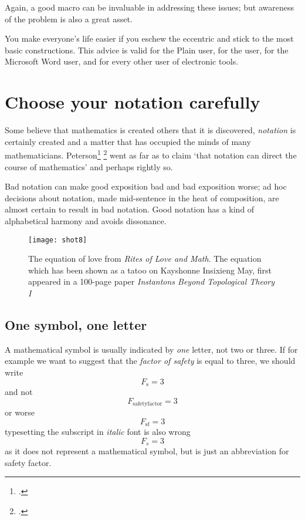 {Again, a good macro can be invaluable in addressing these issues; but
awareness of the problem is also a great asset.

\begin{latexquotation}
You make everyone's
life easier if you eschew the eccentric and stick to the most basic constructions. This advice is valid for the Plain \tex user, for the \latex
user, for the Microsoft Word user, and for every other user of electronic
tools.
\end{latexquotation}



\section{Choose your notation carefully}

Some believe that mathematics is created others that it is discovered, \emph{notation} is certainly created and
a matter that has occupied the minds of many mathematicians. Peterson\footcite{peterson2009} \footcite{peterson2009}  went as far as to claim  `that notation can direct the course of mathematics’ and perhaps rightly so.

Bad notation can make good exposition bad and bad exposition worse; ad hoc decisions about notation, made mid-sentence in the heat of composition, are almost certain to result in bad notation. Good notation has a kind of alphabetical harmony and avoids dissonance.

\begin{figure}[htbp]
\texttt{[image: shot8]}
\caption{The equation of love from \emph{Rites of Love and Math}. The equation which has been shown as a tatoo  on Kayshonne Insixieng May, first appeared in a 100-page paper \emph{Instantons Beyond Topological Theory I} \cite{frenkel2012,FLN}}
\end{figure}


\subsection{One symbol, one letter}

A mathematical symbol is usually indicated by \emph{one} letter, not two or three. If for example we want to suggest that the \textit{factor of safety} is equal to three, we should write
\[F_{\mathrm{s}}=3\]
and not
\[F_{\mathrm{safetyfactor}}=3\]
or worse
\[F_{\mathrm{sf}}=3\]
typesetting the subscript in \textit{italic} font is also wrong
\[F_{s}=3\]
as it does not represent a mathematical symbol, but is just an abbreviation for safety factor.

}
